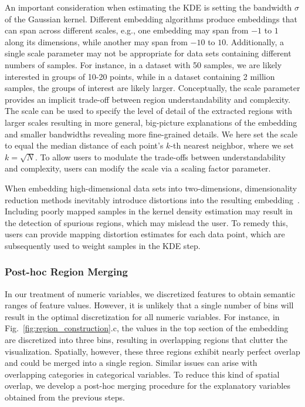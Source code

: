 \documentclass[lettersize,journal]{IEEEtran}
\begin{document}
An important consideration when estimating the KDE is setting the bandwidth $\sigma$ of the Gaussian kernel.
Different embedding algorithms produce embeddings that can span across different scales, e.g., one embedding may span from $-1$ to $1$ along its dimensions, while another may span from $-10$ to $10$.
Additionally, a single scale parameter may not be appropriate for data sets containing different numbers of samples. For instance, in a dataset with 50 samples, we are likely interested in groups of 10-20 points, while in a dataset containing 2 million samples, the groups of interest are likely larger.
Conceptually, the scale parameter provides an implicit trade-off between region understandability and complexity.
The scale can be used to specify the level of detail of the extracted regions with larger scales resulting in more general, big-picture explanations of the embedding and smaller bandwidths revealing more fine-grained details.
We here set the scale to equal the median distance of each point's $k$-th nearest neighbor, where we set $k=\sqrt{N}$.
To allow users to modulate the trade-offs between understandability and complexity, users can modify the scale via a scaling factor parameter.

When embedding high-dimensional data sets into two-dimensions, dimensionality reduction methods inevitably introduce distortions into the resulting embedding~\cite{Martins2014,Lehmann2016,NonatoAupetit2019}. Including poorly mapped samples in the kernel density estimation may result in the detection of spurious regions, which may mislead the user. To remedy this, users can provide mapping distortion estimates for each data point, which are subsequently used to weight samples in the KDE step.

\subsubsection{Post-hoc Region Merging}
\label{sec:post-hoc-merge}

In our treatment of numeric variables, we discretized features to obtain semantic ranges of feature values. However, it is unlikely that a single number of bins will result in the optimal discretization for all numeric variables.
For instance, in Fig.~\ref{fig:region_construction}.c, the values in the top section of the embedding are discretized into three bins, resulting in overlapping regions that clutter the visualization. Spatially, however, these three regions exhibit nearly perfect overlap and could be merged into a single region.
Similar issues can arise with overlapping categories in categorical variables.
To reduce this kind of spatial overlap, we develop a post-hoc merging procedure for the explanatory variables obtained from the previous steps.
\end{document}
